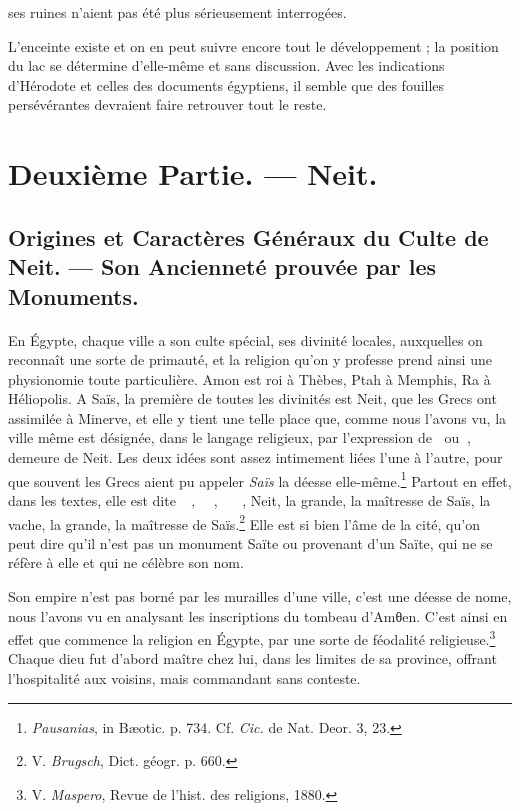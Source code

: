\documentclass[a4paper, 11pt, oneside]{article}
\newcommand*\hieroglyhicsAAAC{}
\newcommand*\hieroglyhicsAAAG{}
\newcommand*\hieroglyhicsAAAI{}
\newcommand*\hieroglyhicsAAAO{}
\newcommand*\hieroglyhicsAAAW{\raisebox{0.5ex}{}}
\newcommand*\hieroglyhicsAABC{\raisebox{0.5ex}{}}
\newcommand*\hieroglyhicsAACS{}
\newcommand*\hieroglyhicsAAHK{}
\newcommand*\hieroglyhicsAAHN{}
\newcommand*\hieroglyhicsAALQ{}
\newcommand*\hieroglyhicsAALR{\raisebox{0.3ex}{}}
\newcommand*\hieroglyhicsAALS{}
\newcommand*\hieroglyhicsAALT{}
\newcommand*\hieroglyhicsAALU{\raisebox{0.5ex}{}}
\newcommand*\hieroglyhicsAALV{}
\newcommand*\hieroglyhicsAALW{}
\begin{document}
ses ruines n'aient pas été plus sérieusement interrogées.

L'enceinte existe et on en peut suivre encore tout le développement ; la position du lac se détermine d'elle-même et sans discussion. Avec les indications d'Hérodote et celles des documents égyptiens, il semble que des fouilles persévérantes devraient faire retrouver tout le reste.
\clearpage
\section{Deuxième Partie. --- Neit.}
\subsection{Origines et Caractères Généraux du Culte de Neit. --- Son Ancienneté prouvée par les Monuments.}
\paragraph{}
En Égypte, chaque ville a son culte spécial, ses divinité locales, auxquelles on reconnaît une sorte de primauté, et la religion qu'on y professe prend ainsi une physionomie toute particulière. Amon est roi à Thèbes, Ptah à Memphis, Ra à Héliopolis. A Saïs, la première de toutes les divinités est Neit, que les Grecs ont assimilée à Minerve, et elle y tient une telle place que, comme nous l'avons vu, la ville même est désignée, dans le langage religieux, par l'expression de $\hieroglyhicsAALQ\:\hieroglyhicsAAHK$ ou $\hieroglyhicsAAHN\:\hieroglyhicsAAAO$, demeure de Neit. Les deux idées sont assez intimement liées l'une à l'autre, pour que souvent les Grecs aient pu appeler \emph{Saïs} la déesse elle-même.\footnote{\emph{Pausanias}, in Bæotic. p. 734. Cf. \emph{Cic.} de Nat. Deor. 3, 23.} Partout en effet, dans les textes, elle est dite $\hieroglyhicsAALQ\:\hieroglyhicsAABC\allowbreak\:\hieroglyhicsAAAI\:\hieroglyhicsAAAW$, $\hieroglyhicsAALR\:\hieroglyhicsAALS\:\hieroglyhicsAABC\allowbreak\:\hieroglyhicsAAAI\:\hieroglyhicsAALT$, $\hieroglyhicsAAAG\:\hieroglyhicsAALU\:\hieroglyhicsAALV\allowbreak\:\hieroglyhicsAALW\:\hieroglyhicsAABC\allowbreak\:\hieroglyhicsAACS\:\hieroglyhicsAAAC$, Neit, la grande, la maîtresse de Saïs, la vache, la grande, la maîtresse de Saïs.\footnote{V. \emph{Brugsch}, Dict. géogr. p. 660.} Elle est si bien l'âme de la cité, qu'on peut dire qu'il n'est pas un monument Saïte ou provenant d'un Saïte, qui ne se réfère à elle et qui ne célèbre son nom.

Son empire n'est pas borné par les murailles d'une ville, c'est une déesse de nome, nous l'avons vu en analysant les inscriptions du tombeau d'Amθen. C'est ainsi en effet que commence la religion en Égypte, par une sorte de féodalité religieuse.\footnote{V. \emph{Maspero}, Revue de l'hist. des religions, 1880.} Chaque dieu fut d'abord maître chez lui, dans les limites de sa province, offrant l'hospitalité aux voisins, mais commandant sans conteste.
\end{document}
